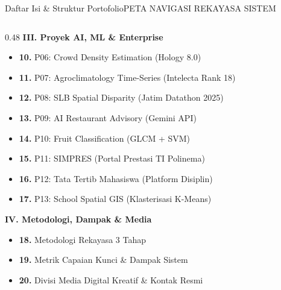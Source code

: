 \documentclass[aspectratio=169,11pt]{beamer}
\begin{document}
\begin{frame}{Daftar Isi \& Struktur Portofolio}{PETA NAVIGASI REKAYASA SISTEM}
\begin{columns}[t]
    \begin{column}{0.48\textwidth}
      {\small \bfseries \color{brandNavy} III. Proyek AI, ML \& Enterprise} \vspace{2pt}
      \begin{itemize}[leftmargin=12pt,itemsep=1.5pt,topsep=1pt]
        \scriptsize
        \item \textbf{10.} P06: Crowd Density Estimation (Hology 8.0)
        \item \textbf{11.} P07: Agroclimatology Time-Series (Intelecta Rank 18)
        \item \textbf{12.} P08: SLB Spatial Disparity (Jatim Datathon 2025)
        \item \textbf{13.} P09: AI Restaurant Advisory (Gemini API)
        \item \textbf{14.} P10: Fruit Classification (GLCM + SVM)
        \item \textbf{15.} P11: SIMPRES (Portal Prestasi TI Polinema)
        \item \textbf{16.} P12: Tata Tertib Mahasiswa (Platform Disiplin)
        \item \textbf{17.} P13: School Spatial GIS (Klasterisasi K-Means)
      \end{itemize}
      \vspace{5pt}
      {\small \bfseries \color{brandNavy} IV. Metodologi, Dampak \& Media} \vspace{2pt}
      \begin{itemize}[leftmargin=12pt,itemsep=1.5pt,topsep=1pt]
        \scriptsize
        \item \textbf{18.} Metodologi Rekayasa 3 Tahap
        \item \textbf{19.} Metrik Capaian Kunci \& Dampak Sistem
        \item \textbf{20.} Divisi Media Digital Kreatif \& Kontak Resmi
      \end{itemize}
    \end{column}
  \end{columns}
\end{frame}
\end{document}
